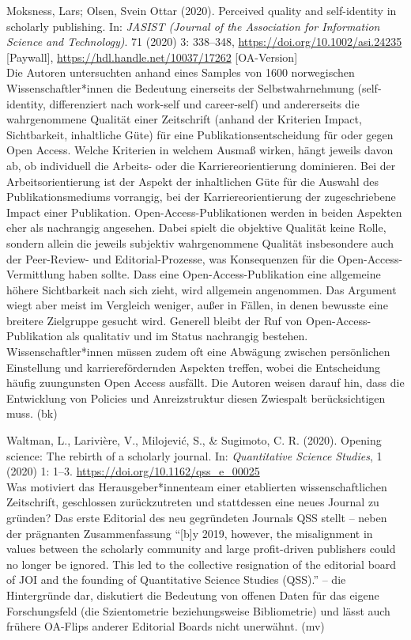 \documentclass[a4paper,
fontsize=11pt,
oneside,
numbers=noperiodatend,
parskip=half-,
bibliography=totoc,
final
]{scrartcl}
\begin{document}
Moksness, Lars; Olsen, Svein Ottar (2020). Perceived quality and
self-identity in scholarly publishing. In: \emph{JASIST (Journal of the
Association for Information Science and Technology)}. 71 (2020) 3:
338--348, \url{https://doi.org/10.1002/asi.24235} {[}Paywall{]},
\url{https://hdl.handle.net/10037/17262} {[}OA-Version{]}\\
Die Autoren untersuchten anhand eines Samples von 1600 norwegischen
Wissenschaftler*innen die Bedeutung einerseits der Selbstwahrnehmung
(self-identity, differenziert nach work-self und career-self) und
andererseits die wahrgenommene Qualität einer Zeitschrift (anhand der
Kriterien Impact, Sichtbarkeit, inhaltliche Güte) für eine
Publikationsentscheidung für oder gegen Open Access. Welche Kriterien in
welchem Ausmaß wirken, hängt jeweils davon ab, ob individuell die
Arbeits- oder die Karriereorientierung dominieren. Bei der
Arbeitsorientierung ist der Aspekt der inhaltlichen Güte für die Auswahl
des Publikationsmediums vorrangig, bei der Karriereorientierung der
zugeschriebene Impact einer Publikation. Open-Access-Publikationen
werden in beiden Aspekten eher als nachrangig angesehen. Dabei spielt
die objektive Qualität keine Rolle, sondern allein die jeweils subjektiv
wahrgenommene Qualität insbesondere auch der Peer-Review- und
Editorial-Prozesse, was Konsequenzen für die Open-Access-Vermittlung
haben sollte. Dass eine Open-Access-Publikation eine allgemeine höhere
Sichtbarkeit nach sich zieht, wird allgemein angenommen. Das Argument
wiegt aber meist im Vergleich weniger, außer in Fällen, in denen
bewusste eine breitere Zielgruppe gesucht wird. Generell bleibt der Ruf
von Open-Access-Publikation als qualitativ und im Status nachrangig
bestehen. Wissenschaftler*innen müssen zudem oft eine Abwägung zwischen
persönlichen Einstellung und karrierefördernden Aspekten treffen, wobei
die Entscheidung häufig zuungunsten Open Access ausfällt. Die Autoren
weisen darauf hin, dass die Entwicklung von Policies und Anreizstruktur
diesen Zwiespalt berücksichtigen muss. (bk)

Waltman, L., Larivière, V., Milojević, S., \& Sugimoto, C. R. (2020).
Opening science: The rebirth of a scholarly journal. In:
\emph{Quantitative Science Studies}, 1 (2020) 1: 1--3.
\url{https://doi.org/10.1162/qss_e_00025}\\
Was motiviert das Herausgeber*innenteam einer etablierten
wissenschaftlichen Zeitschrift, geschlossen zurückzutreten und
stattdessen eine neues Journal zu gründen? Das erste Editorial des neu
gegründeten Journals QSS stellt -- neben der prägnanten Zusammenfassung
``{[}b{]}y 2019, however, the misalignment in values between the
scholarly community and large profit-driven publishers could no longer
be ignored. This led to the collective resignation of the editorial
board of JOI and the founding of Quantitative Science Studies (QSS).''
-- die Hintergründe dar, diskutiert die Bedeutung von offenen Daten für
das eigene Forschungsfeld (die Szientometrie beziehungsweise
Bibliometrie) und lässt auch frühere OA-Flips anderer Editorial Boards
nicht unerwähnt. (mv)
\end{document}
